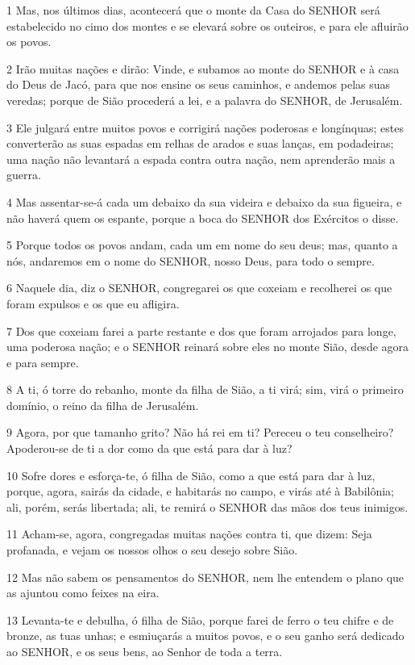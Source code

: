 \par 1 Mas, nos últimos dias, acontecerá que o monte da Casa do SENHOR será estabelecido no cimo dos montes e se elevará sobre os outeiros, e para ele afluirão os povos.
\par 2 Irão muitas nações e dirão: Vinde, e subamos ao monte do SENHOR e à casa do Deus de Jacó, para que nos ensine os seus caminhos, e andemos pelas suas veredas; porque de Sião procederá a lei, e a palavra do SENHOR, de Jerusalém.
\par 3 Ele julgará entre muitos povos e corrigirá nações poderosas e longínquas; estes converterão as suas espadas em relhas de arados e suas lanças, em podadeiras; uma nação não levantará a espada contra outra nação, nem aprenderão mais a guerra.
\par 4 Mas assentar-se-á cada um debaixo da sua videira e debaixo da sua figueira, e não haverá quem os espante, porque a boca do SENHOR dos Exércitos o disse.
\par 5 Porque todos os povos andam, cada um em nome do seu deus; mas, quanto a nós, andaremos em o nome do SENHOR, nosso Deus, para todo o sempre.
\par 6 Naquele dia, diz o SENHOR, congregarei os que coxeiam e recolherei os que foram expulsos e os que eu afligira.
\par 7 Dos que coxeiam farei a parte restante e dos que foram arrojados para longe, uma poderosa nação; e o SENHOR reinará sobre eles no monte Sião, desde agora e para sempre.
\par 8 A ti, ó torre do rebanho, monte da filha de Sião, a ti virá; sim, virá o primeiro domínio, o reino da filha de Jerusalém.
\par 9 Agora, por que tamanho grito? Não há rei em ti? Pereceu o teu conselheiro? Apoderou-se de ti a dor como da que está para dar à luz?
\par 10 Sofre dores e esforça-te, ó filha de Sião, como a que está para dar à luz, porque, agora, sairás da cidade, e habitarás no campo, e virás até à Babilônia; ali, porém, serás libertada; ali, te remirá o SENHOR das mãos dos teus inimigos.
\par 11 Acham-se, agora, congregadas muitas nações contra ti, que dizem: Seja profanada, e vejam os nossos olhos o seu desejo sobre Sião.
\par 12 Mas não sabem os pensamentos do SENHOR, nem lhe entendem o plano que as ajuntou como feixes na eira.
\par 13 Levanta-te e debulha, ó filha de Sião, porque farei de ferro o teu chifre e de bronze, as tuas unhas; e esmiuçarás a muitos povos, e o seu ganho será dedicado ao SENHOR, e os seus bens, ao Senhor de toda a terra.


